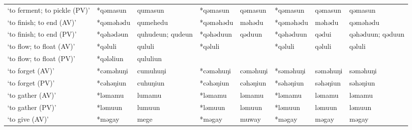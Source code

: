 \begin{landscape}
\begin{longtable}[c]{@{}p{3cm}<{\raggedright}p{2.75cm}<{\raggedright}p{2.75cm}<{\raggedright}p{2.75cm}<{\raggedright}p{2.75cm}<{\raggedright}p{2.75cm}<{\raggedright}p{2.75cm}<{\raggedright}p{2.75cm}<{\raggedright}@{}}
`to ferment; to pickle (PV)'                         & *qəmasun           & qumasun                        & *qəmasun           & qəmasun                    & *qəmasun         & qəmasun                  & qəmasun                           \\
`to finish; to end (AV)'                             & *qəməhədu          & qumehedu                       & *qəməhədu          & məhədu                     & *qəməhədu        & məhədu                   & qəməhədu                          \\
`to finish; to end (PV)'                             & *qəhədəun          & quhudeun; qudeun               & *qəhəduun          & qəduun                     & *qəhəduun        & qədui                    & qəhəduun; qəduun                  \\
`to flow; to float (AV)'                             & *qəluli            & qululi                         & *qəluli            &                            & *qəluli          & qəluli                   & qəluli                            \\
`to flow; to float (PV)'                             & *qələliun          & qululiun                       &                    &                            &                  &                          &                                   \\
`to forget (AV)'                                     & *cəməhuŋi          & cumuhuŋi                       & *cəməhuŋi          & cəməhuŋi                   & *səməhuŋi        & səməhuŋi                 & səməhuŋi                          \\
`to forget (PV)'                                     & *cəhəŋiun          & cuhuŋiun                       & *cəhəŋiun          & cəhəŋiun                   & *səhəŋiun        & səhəŋiun                 & səhəŋiun                          \\
`to gather (AV)'                                     & *ləmamu            & lumamu                         & *ləmamu            & ləmamu                     & *ləmamu          & ləmamu                   & ləmamu                            \\
`to gather (PV)'                                     & *ləmuun            & lumuun                         & *ləmuun            & ləmuun                     & *ləmuun          & ləmuun                   & ləmuun                            \\
`to give (AV)'                                       & *məgay             & mege                           & *məgay             & muway                      & *məgay           & məgay                    & məgay                             \\

\end{longtable}
\end{landscape}
